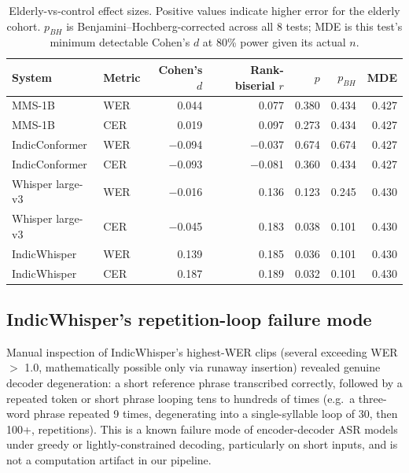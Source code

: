 \documentclass[11pt]{article}
\begin{document}
\begin{table}[H]
\centering
\caption{Elderly-vs-control effect sizes. Positive values indicate higher error for the elderly
cohort. $p_{BH}$ is Benjamini--Hochberg-corrected across all 8 tests; MDE is this test's minimum
detectable Cohen's $d$ at 80\% power given its actual $n$.}
\label{tab:effects}
\small
\begin{tabular}{llrrrrr}
\toprule
\textbf{System} & \textbf{Metric} & \textbf{Cohen's $d$} & \textbf{Rank-biserial $r$} & \textbf{$p$} & \textbf{$p_{BH}$} & \textbf{MDE} \\
\midrule
MMS-1B & WER & 0.044 & 0.077 & 0.380 & 0.434 & 0.427 \\
MMS-1B & CER & 0.019 & 0.097 & 0.273 & 0.434 & 0.427 \\
IndicConformer & WER & $-$0.094 & $-$0.037 & 0.674 & 0.674 & 0.427 \\
IndicConformer & CER & $-$0.093 & $-$0.081 & 0.360 & 0.434 & 0.427 \\
Whisper large-v3 & WER & $-$0.016 & 0.136 & 0.123 & 0.245 & 0.430 \\
Whisper large-v3 & CER & $-$0.045 & 0.183 & 0.038 & 0.101 & 0.430 \\
IndicWhisper & WER & 0.139 & 0.185 & 0.036 & 0.101 & 0.430 \\
IndicWhisper & CER & 0.187 & 0.189 & 0.032 & 0.101 & 0.430 \\
\bottomrule
\end{tabular}
\end{table}

\subsection{IndicWhisper's repetition-loop failure mode}
\label{sec:degenerate}

Manual inspection of IndicWhisper's highest-WER clips (several exceeding WER $>$ 1.0, mathematically
possible only via runaway insertion) revealed genuine decoder degeneration: a short reference
phrase transcribed correctly, followed by a repeated token or short phrase looping tens to
hundreds of times (e.g.\ a three-word phrase repeated 9 times, degenerating into a single-syllable
loop of 30, then 100+, repetitions). This is a known failure mode of encoder-decoder ASR models
under greedy or lightly-constrained decoding, particularly on short inputs, and is not a
computation artifact in our pipeline.
\end{document}
